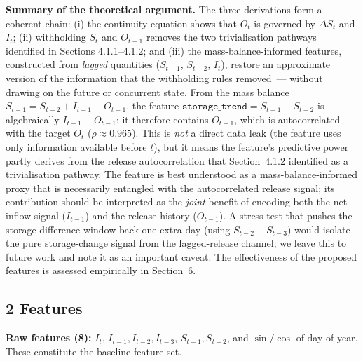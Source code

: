 \documentclass[journal]{ascelike-new}
\begin{document}
\textbf{Summary of the theoretical argument.} The three derivations form a coherent chain: (i) the continuity equation shows that $O_t$ is governed by $\Delta S_t$ and $I_t$; (ii) withholding $S_t$ and $O_{t-1}$ removes the two trivialisation pathways identified in Sections 4.1.1--4.1.2; and (iii) the mass-balance-informed features, constructed from \emph{lagged} quantities ($S_{t-1}$, $S_{t-2}$, $I_t$), restore an approximate version of the information that the withholding rules removed\ --- without drawing on the future or concurrent state. From the mass balance $S_{t-1} = S_{t-2} + I_{t-1} - O_{t-1}$, the feature $\texttt{storage\_trend} = S_{t-1} - S_{t-2}$ is algebraically $I_{t-1} - O_{t-1}$; it therefore contains $O_{t-1}$, which is autocorrelated with the target $O_t$ ($\rho \approx 0.965$). This is \emph{not} a direct data leak (the feature uses only information available before $t$), but it means the feature's predictive power partly derives from the release autocorrelation that Section~4.1.2 identified as a trivialisation pathway. The feature is best understood as a mass-balance-informed proxy that is necessarily entangled with the autocorrelated release signal; its contribution should be interpreted as the \emph{joint} benefit of encoding both the net inflow signal ($I_{t-1}$) and the release history ($O_{t-1}$). A stress test that pushes the storage-difference window back one extra day (using $S_{t-2}{-}S_{t-3}$) would isolate the pure storage-change signal from the lagged-release channel; we leave this to future work and note it as an important caveat. The effectiveness of the proposed features is assessed empirically in Section~6.


\subsection{2 Features}


\textbf{Raw features (8):} $I_t$, $I_{t-1}, I_{t-2}, I_{t-3}$, $S_{t-1}, S_{t-2}$, and $\sin/\cos$ of day-of-year. These constitute the baseline feature set.
\end{document}
